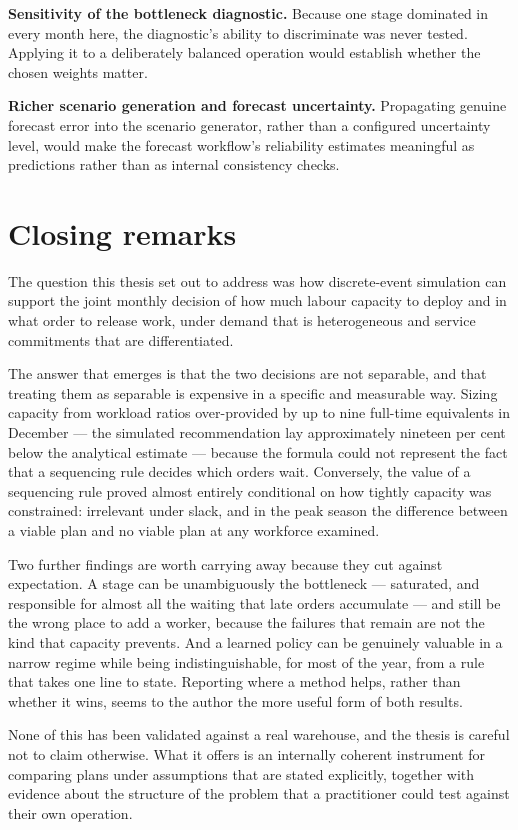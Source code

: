 \textbf{Sensitivity of the bottleneck diagnostic.} Because one stage dominated in every month
here, the diagnostic's ability to discriminate was never tested. Applying it to a deliberately
balanced operation would establish whether the chosen weights matter.

\textbf{Richer scenario generation and forecast uncertainty.} Propagating genuine forecast error
into the scenario generator, rather than a configured uncertainty level, would make the forecast
workflow's reliability estimates meaningful as predictions rather than as internal consistency
checks.

\section{Closing remarks}
\label{sec:closing}

The question this thesis set out to address was how discrete-event simulation can support the
joint monthly decision of how much labour capacity to deploy and in what order to release work,
under demand that is heterogeneous and service commitments that are differentiated.

The answer that emerges is that the two decisions are not separable, and that treating them as
separable is expensive in a specific and measurable way. Sizing capacity from workload ratios
over-provided by up to nine full-time equivalents in December --- the simulated recommendation
lay approximately nineteen per cent below the analytical estimate --- because the formula could
not represent the fact that a sequencing rule decides which orders wait. Conversely, the value of a sequencing rule proved
almost entirely conditional on how tightly capacity was constrained: irrelevant under slack,
and in the peak season the difference between a viable plan and no viable plan at any workforce
examined.

Two further findings are worth carrying away because they cut against expectation. A stage can
be unambiguously the bottleneck --- saturated, and responsible for almost all the waiting that
late orders accumulate --- and still be the wrong place to add a worker, because the failures
that remain are not the kind that capacity prevents. And a learned policy can be genuinely
valuable in a narrow regime while being indistinguishable, for most of the year, from a rule
that takes one line to state. Reporting where a method helps, rather than whether it wins, seems
to the author the more useful form of both results.

None of this has been validated against a real warehouse, and the thesis is careful not to
claim otherwise. What it offers is an internally coherent instrument for comparing plans under
assumptions that are stated explicitly, together with evidence about the structure of the
problem that a practitioner could test against their own operation.
